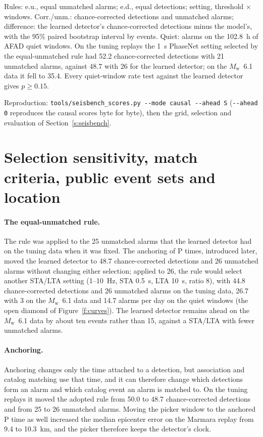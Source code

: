 \documentclass[11pt,a4paper]{article}
\newcommand{\Mw}{$M_\mathrm{w}$}
\newcommand{\stalta}{STA/LTA}
\newcommand{\tool}[1]{\nolinkurl{#1}}
\begin{document}
\noindent Rules: e.u., equal unmatched alarms; e.d., equal detections; setting,
threshold $\times$ windows. Corr./unm.: chance-corrected detections and unmatched alarms;
difference: the learned detector's chance-corrected detections minus the model's,
with the 95\% paired bootstrap interval by events. Quiet: alarms on the 102.8~h of
AFAD quiet windows. On the tuning replays the 1~s PhaseNet setting selected by the
equal-unmatched rule had 52.2 chance-corrected detections with 21 unmatched alarms,
against 48.7 with 26 for the learned detector; on the \Mw{}~6.1 data it fell to
35.4. Every quiet-window rate test against the learned detector gives
$p \geq 0.15$.

\noindent Reproduction: \tool{tools/seisbench_scores.py --mode causal --ahead S}
(\tool{--ahead 0} reproduces the causal scores byte for byte), then the grid,
selection and evaluation of Section~\ref{s:seisbench}.

\clearpage
\section{Selection sensitivity, match criteria, public event sets and location}\label{s:more}

\paragraph{The equal-unmatched rule.} The rule was applied to the 25 unmatched
alarms that the learned detector had on the tuning data when it was fixed. The
anchoring of P times, introduced later, moved the learned detector to 48.7
chance-corrected detections and 26 unmatched alarms without changing either
selection; applied to 26, the rule would select another \stalta{} setting
(1--10~Hz, STA 0.5~s, LTA 10~s, ratio 8), with 44.8 chance-corrected detections and
26 unmatched alarms on the tuning data, 26.7 with 3 on the \Mw{}~6.1 data and 14.7
alarms per day on the quiet windows (the open diamond of Figure~\ref{f:curves}). The
learned detector remains ahead on the \Mw{}~6.1 data by about ten events rather
than 15, against a \stalta{} with fewer unmatched alarms.

\paragraph{Anchoring.} Anchoring changes only the time attached to a detection,
but association and catalog matching use that time, and it can therefore change which detections form an alarm and which catalog event an alarm is matched to. On the tuning replays it moved the adopted rule from 50.0 to 48.7 chance-corrected
detections and from 25 to 26 unmatched alarms. Moving the picker window to the
anchored P time as well increased the median epicenter error on the Marmara replay
from 9.4 to 10.3~km, and the picker therefore keeps the detector's clock.
\end{document}
